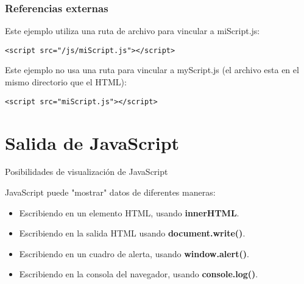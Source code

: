 \begin{frame}[fragile]
  \frametitle{Referencias externas}

  \vspace{\baselineskip}
  Este ejemplo utiliza una ruta de archivo para vincular a miScript.js:

  \vspace{\baselineskip}
  \begin{lstlisting}
<script src="/js/miScript.js"></script>
  \end{lstlisting}

  \vspace{\baselineskip}
  Este ejemplo no usa una ruta para vincular a myScript.js (el archivo esta
  en el mismo directorio que el HTML):

  \vspace{\baselineskip}
  \begin{lstlisting}
<script src="miScript.js"></script>
  \end{lstlisting}
\end{frame}

\section{Salida de JavaScript}

\begin{frame}[c]{Posibilidades de visualización de JavaScript}

  JavaScript puede "mostrar" datos de diferentes maneras:

  \begin{itemize}
    \item Escribiendo en un elemento HTML, usando \textbf{innerHTML}.
    \item Escribiendo en la salida HTML usando \textbf{document.write()}.
    \item Escribiendo en un cuadro de alerta, usando \textbf{window.alert()}.
    \item Escribiendo en la consola del navegador, usando
      \textbf{console.log()}.
  \end{itemize}
\end{frame}
